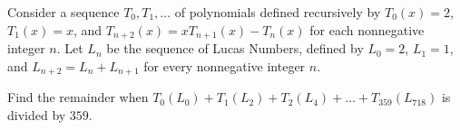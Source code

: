 Consider a sequence $T_0, T_1, \dots$ of polynomials defined recursively by $T_0(x) = 2$, $T_1(x)=x$, and $T_{n+2}(x) = xT_{n+1}(x) - T_n(x)$ for each nonnegative integer $n$.  Let $L_n$ be the sequence of Lucas Numbers, defined by $L_0 = 2$, $L_1 = 1$, and $L_{n+2} = L_n+L_{n+1}$ for every nonnegative integer $n$. 

Find the remainder when $ T_0\left( L_0 \right) + T_1 \left( L_2 \right) + T_2 \left( L_4 \right) + \dots + T_{359} \left( L_{718} \right)$ is divided by $359$.
